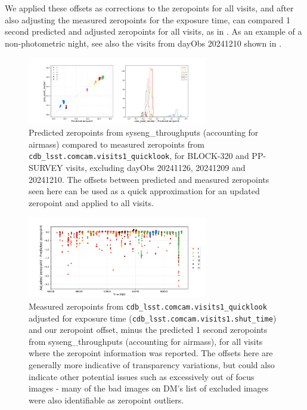 We applied these offsets as corrections to the zeropoints for all visits, and after also adjusting the measured zeropoints for the exposure time, can compared 1 second predicted and adjusted zeropoints for all visits, as in .  As an example of a non-photometric night, see also the visits from dayObs 20241210 shown in . 

\begin{figure}
    \centering
    \includegraphics[width=0.7\textwidth]{sp/zeropoints.png}
    \caption{Predicted zeropoints from syseng\_throughputs (accounting for airmass) compared to measured zeropoints from \texttt{cdb\_lsst.comcam.visits1\_quicklook},  for BLOCK-320 and PP-SURVEY visits, excluding dayObs 20241126, 20241209 and  20241210. The offsets between predicted and measured zeropoints seen here can be used as a quick approximation for an updated zeropoint and applied to all visits.}
    \label{fig:zeropoints}
    \end{figure}

\begin{figure}
    \centering
    \includegraphics[width=0.7\textwidth]{sp/all_zeropoints.png}
    \caption{Measured zeropoints from \texttt{cdb\_lsst.comcam.visits1\_quicklook} adjusted for exposure time (\texttt{cdb\_lsst.comcam.visits1.shut\_time}) and our zeropoint offset, minus the predicted 1 second zeropoints from syseng\_throughputs (accounting for airmass), for all visits where the zeropoint information was reported. The offsets here are generally more indicative of transparency variations, but could also indicate other potential issues such as excessively out of focus images - many of the bad images on DM's list of excluded images were also identifiable as zeropoint outliers.}
    \label{fig:all_zeropoints}
    \end{figure}



